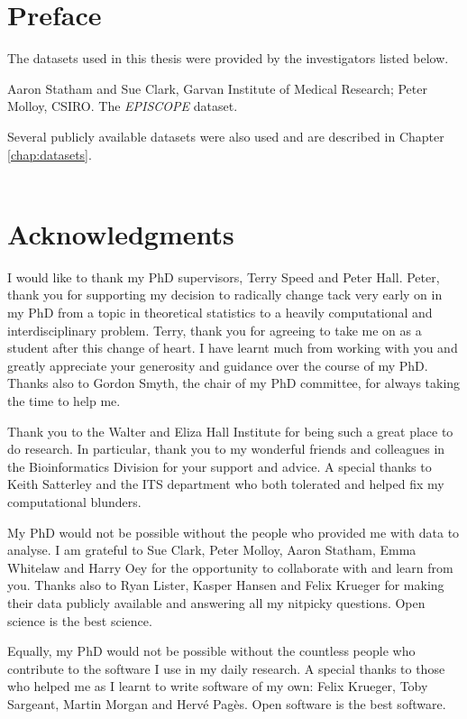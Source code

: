 \documentclass[11pt,a4paper,oneside]{book}	%
\begin{document}
\chapter{Preface}

The datasets used in this thesis were provided by the investigators listed below.

Aaron Statham and Sue Clark, Garvan Institute of Medical Research; Peter Molloy, CSIRO. The \emph{EPISCOPE} dataset.

Several publicly available datasets were also used and are described in Chapter \ref{chap:datasets}.\\\\

\chapter{Acknowledgments}

I would like to thank my PhD supervisors, Terry Speed and  Peter Hall. Peter, thank you for supporting my decision to radically change tack very early on in my PhD from a topic in theoretical statistics to a heavily computational and interdisciplinary problem. Terry, thank you for agreeing to take me on as a student after this change of heart. I have learnt much from working with you and greatly appreciate your generosity and guidance over the course of my PhD. Thanks also to Gordon Smyth, the chair of my PhD committee, for always taking the time to help me.

Thank you to the Walter and Eliza Hall Institute for being such a great place to do research. In particular, thank you to my wonderful friends and colleagues in the Bioinformatics Division for your support and advice. A special thanks to Keith Satterley and the ITS department who both tolerated and helped fix my computational blunders.

My PhD would not be possible without the people who provided me with data to analyse. I am grateful to Sue Clark, Peter Molloy, Aaron Statham, Emma Whitelaw and Harry Oey for the opportunity to collaborate with and learn from you. Thanks also to Ryan Lister, Kasper Hansen and Felix Krueger for making their data publicly available and answering all my nitpicky questions. Open science is the best science.

Equally, my PhD would not be possible without the countless people who contribute to the software I use in my daily research. A special thanks to those who helped me as I learnt to write software of my own: Felix Krueger, Toby Sargeant, Martin Morgan and Hervé Pagès. Open software is the best software.
\end{document}
